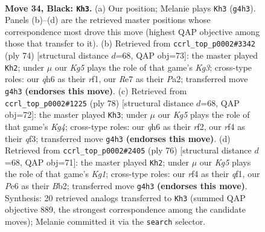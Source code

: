 \documentclass[11pt]{article}
\begin{document}
\clearpage

\begin{figure}[p]\centering
\begin{subfigure}{0.46\textwidth}\centering
\resizebox{\linewidth}{!}{%
\newchessgame
\chessboard[
  setfen={8/p3r3/p3p2Q/8/4BRkq/1N6/1P6/2B3K1 b - - 5 34},
  showmover=false,
  pgfstyle=straightmove, color=movearrow, markmove={g4-h3}
]}
\caption{}
\end{subfigure}\hfill
\begin{subfigure}{0.46\textwidth}\centering
\resizebox{\linewidth}{!}{%
\newchessgame
\chessboard[
  setfen={8/2Q1R3/5pk1/3p4/8/6KP/PP3qP1/5r2 w - - 2 38},
  showmover=false,
  pgfstyle=straightmove, color=movearrow, markmove={g3-h2}
]}
\caption{}
\end{subfigure}
\\[4pt]
\begin{subfigure}{0.46\textwidth}\centering
\resizebox{\linewidth}{!}{%
\newchessgame
\chessboard[
  setfen={7k/p7/1pR3QP/8/3P2K1/5qP1/5r2/8 w - - 5 40},
  showmover=false,
  pgfstyle=straightmove, color=movearrow, markmove={g4-h3}
]}
\caption{}
\end{subfigure}\hfill
\begin{subfigure}{0.46\textwidth}\centering
\resizebox{\linewidth}{!}{%
\newchessgame
\chessboard[
  setfen={5k2/5p2/3p4/3P4/6QP/P2b4/1B3P2/5qK1 w - - 0 39},
  showmover=false,
  pgfstyle=straightmove, color=movearrow, markmove={g1-h2}
]}
\caption{}
\end{subfigure}
\caption{\textbf{Move 34, Black: \texttt{Kh3}.} (a) Our position; Melanie plays \texttt{Kh3} (\texttt{g4h3}). Panels (b)--(d) are the retrieved master positions whose correspondence most drove this move (highest QAP objective among those that transfer to it). (b) Retrieved from \texttt{ccrl\_top\_p0002\#3342} (ply 74) [structural distance $d$=68, QAP obj=73]: the master played \texttt{Kh2}; under $\mu$ our \emph{Kg5} plays the role of that game's \emph{Kg3}; cross-type roles: our \emph{q}h6 as their \emph{r}f1, our \emph{R}e7 as their \emph{P}a2; transferred move \texttt{g4h3} \textbf{(endorses this move)}. (c) Retrieved from \texttt{ccrl\_top\_p0002\#1225} (ply 78) [structural distance $d$=68, QAP obj=72]: the master played \texttt{Kh3}; under $\mu$ our \emph{Kg5} plays the role of that game's \emph{Kg4}; cross-type roles: our \emph{q}h6 as their \emph{r}f2, our \emph{r}f4 as their \emph{q}f3; transferred move \texttt{g4h3} \textbf{(endorses this move)}. (d) Retrieved from \texttt{ccrl\_top\_p0002\#2405} (ply 76) [structural distance $d$=68, QAP obj=71]: the master played \texttt{Kh2}; under $\mu$ our \emph{Kg5} plays the role of that game's \emph{Kg1}; cross-type roles: our \emph{r}f4 as their \emph{q}f1, our \emph{P}e6 as their \emph{B}b2; transferred move \texttt{g4h3} \textbf{(endorses this move)}. Synthesis: 20 retrieved analogs transferred to \texttt{Kh3} (summed QAP objective 889, the strongest correspondence among the candidate moves); Melanie committed it via the \texttt{search} selector.}
\label{fig:thought-m67}
\end{figure}
\end{document}
